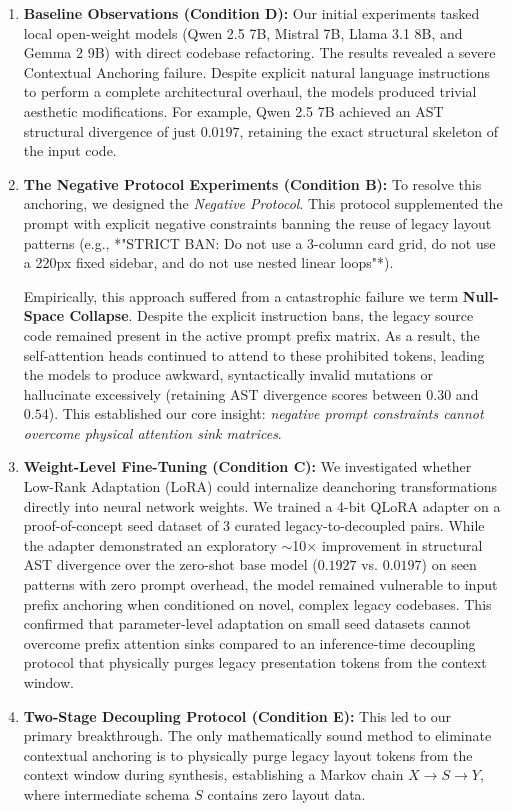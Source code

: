 \documentclass[10pt,journal,compsoc]{IEEEtran}
\begin{document}
\begin{enumerate}
    \item \textbf{Baseline Observations (Condition D):} Our initial experiments tasked local open-weight models (Qwen 2.5 7B, Mistral 7B, Llama 3.1 8B, and Gemma 2 9B) with direct codebase refactoring. The results revealed a severe Contextual Anchoring failure. Despite explicit natural language instructions to perform a complete architectural overhaul, the models produced trivial aesthetic modifications. For example, Qwen 2.5 7B achieved an AST structural divergence of just $0.0197$, retaining the exact structural skeleton of the input code.
    
    \item \textbf{The Negative Protocol Experiments (Condition B):} To resolve this anchoring, we designed the \textit{Negative Protocol}. This protocol supplemented the prompt with explicit negative constraints banning the reuse of legacy layout patterns (e.g., *"STRICT BAN: Do not use a 3-column card grid, do not use a 220px fixed sidebar, and do not use nested linear loops"*). 
    
    Empirically, this approach suffered from a catastrophic failure we term \textbf{Null-Space Collapse}. Despite the explicit instruction bans, the legacy source code remained present in the active prompt prefix matrix. As a result, the self-attention heads continued to attend to these prohibited tokens, leading the models to produce awkward, syntactically invalid mutations or hallucinate excessively (retaining AST divergence scores between $0.30$ and $0.54$). This established our core insight: \textit{negative prompt constraints cannot overcome physical attention sink matrices}.
    
    \item \textbf{Weight-Level Fine-Tuning (Condition C):} We investigated whether Low-Rank Adaptation (LoRA) could internalize deanchoring transformations directly into neural network weights. We trained a 4-bit QLoRA adapter on a proof-of-concept seed dataset of 3 curated legacy-to-decoupled pairs. While the adapter demonstrated an exploratory $\sim$10$\times$ improvement in structural AST divergence over the zero-shot base model ($0.1927$ vs. $0.0197$) on seen patterns with zero prompt overhead, the model remained vulnerable to input prefix anchoring when conditioned on novel, complex legacy codebases. This confirmed that parameter-level adaptation on small seed datasets cannot overcome prefix attention sinks compared to an inference-time decoupling protocol that physically purges legacy presentation tokens from the context window.
    
    \item \textbf{Two-Stage Decoupling Protocol (Condition E):} This led to our primary breakthrough. The only mathematically sound method to eliminate contextual anchoring is to physically purge legacy layout tokens from the context window during synthesis, establishing a Markov chain $X \to S \to Y$, where intermediate schema $S$ contains zero layout data.
\end{enumerate}
\end{document}

